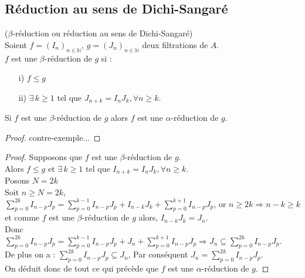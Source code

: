 \subsection{Réduction au sens de Dichi-Sangaré}
\begin{madefinition}
	($\beta$-réduction ou réduction au sens de Dichi-Sangaré)\\
	Soient $f = (I_n)_{n \in \mathbb{N}}$, $g = (J_n)_{n \in \mathbb{N}}$ deux filtrations de $A$.\\
	$f$ est une $\beta$-réduction de $g$ si : \\
	\begin{enumerate}
		\item[i)] $f \leq g$
		\item[ii)]  $\exists \, k \geq 1$ tel que $J_{n+k} = I_n J_k , \forall n \geq k$.
	\end{enumerate}
\end{madefinition}
\begin{maremarque}
	Si $f$ est une $\beta$-réduction de $g$ alors $f$ est une $\alpha$-réduction de $g$.\\	
\end{maremarque}
\begin{proof}
	contre-exemple...
\end{proof}
\begin{proof}
	Supposons que $f$ est une $\beta$-réduction de $g$.\\
	Alors $f \leq g$ et $\exists \, k \geq 1$ tel que $I_{n+k} = I_n J_k , \forall n \geq k$.\\
	Posons $N = 2k$\\
	Soit $n \geq N= 2k$,\\
	$\displaystyle \sum_{p=0}^{2k}{I_{n-p} J_{p}} = \displaystyle \sum_{p=0}^{k-1}{I_{n-p} J_{p}} + I_{n-k} J_k + \displaystyle \sum_{p=0}^{k+1}{I_{n-p} J_{p}}$, or $n \geq  2k \Rightarrow n-k \geq k$ et comme $f$ est une $\beta$-réduction de $g$ alors, $I_{n-k} J_k = J_n$.\\
	Donc $\displaystyle \sum_{p=0}^{2k}{I_{n-p} J_{p}} = \displaystyle \sum_{p=0}^{k-1}{I_{n-p} J_{p}} + J_n + \displaystyle \sum_{p=0}^{k+1}{I_{n-p} J_{p}} \Rightarrow J_n \subseteq \displaystyle \sum_{p=0}^{2k}{I_{n-p} J_{p}}$.\\
	De plus on a : $\displaystyle \sum_{p=0}^{2k}{I_{n-p} J_{p}} \subseteq J_n$, 
	Par conséquent $J_n = \displaystyle \sum_{p=0}^{2k}{I_{n-p} J_{p}}$.\\
	On déduit donc de tout ce qui précède que $f$ est une $\alpha$-réduction de $g$.
\end{proof}
